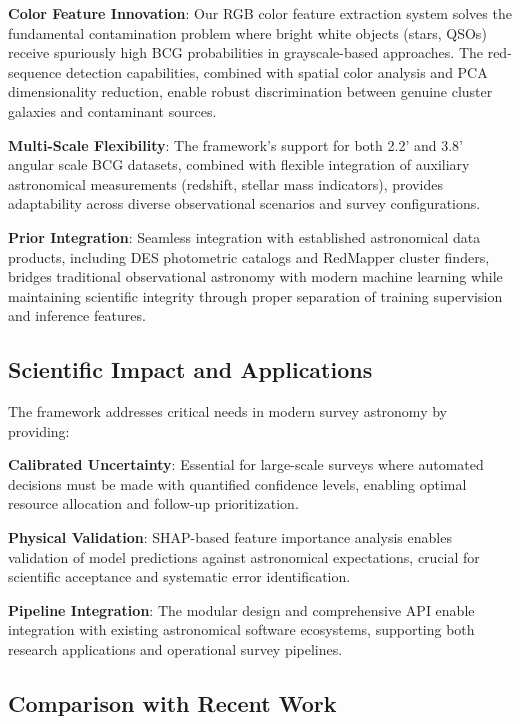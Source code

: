 \documentclass[twocolumn,10pt]{aastex631}
\begin{document}
\textbf{Color Feature Innovation}: Our RGB color feature extraction system solves the fundamental contamination problem where bright white objects (stars, QSOs) receive spuriously high BCG probabilities in grayscale-based approaches. The red-sequence detection capabilities, combined with spatial color analysis and PCA dimensionality reduction, enable robust discrimination between genuine cluster galaxies and contaminant sources.

\textbf{Multi-Scale Flexibility}: The framework's support for both 2.2' and 3.8' angular scale BCG datasets, combined with flexible integration of auxiliary astronomical measurements (redshift, stellar mass indicators), provides adaptability across diverse observational scenarios and survey configurations.

\textbf{Prior Integration}: Seamless integration with established astronomical data products, including DES photometric catalogs \citep{Rykoff2016DES} and RedMapper cluster finders, bridges traditional observational astronomy with modern machine learning while maintaining scientific integrity through proper separation of training supervision and inference features.

\subsection{Scientific Impact and Applications}

The framework addresses critical needs in modern survey astronomy by providing:

\textbf{Calibrated Uncertainty}: Essential for large-scale surveys where automated decisions must be made with quantified confidence levels, enabling optimal resource allocation and follow-up prioritization.

\textbf{Physical Validation}: SHAP-based feature importance analysis enables validation of model predictions against astronomical expectations, crucial for scientific acceptance and systematic error identification.

\textbf{Pipeline Integration}: The modular design and comprehensive API enable integration with existing astronomical software ecosystems, supporting both research applications and operational survey pipelines.

\subsection{Comparison with Recent Work}
\end{document}
